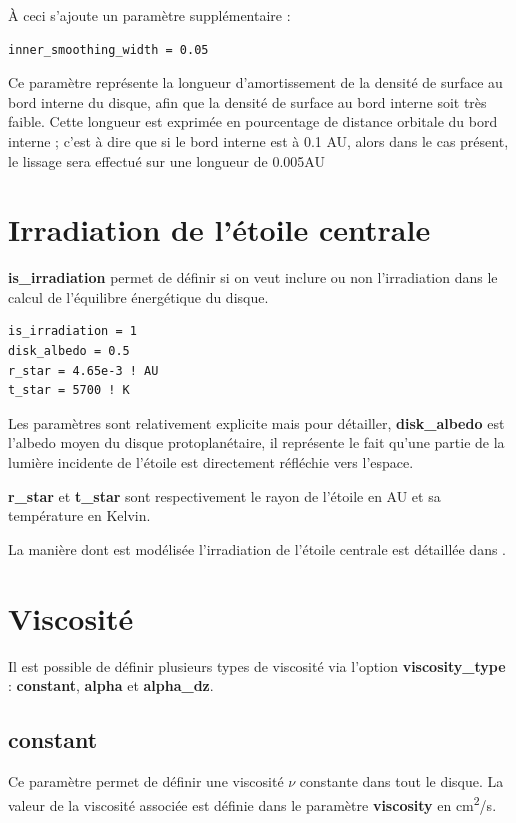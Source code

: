 \bigskip

À ceci s'ajoute un paramètre supplémentaire : 
\begin{verbatim}
inner_smoothing_width = 0.05
\end{verbatim}

Ce paramètre représente la longueur d'amortissement de la densité de surface au bord interne du disque, afin que la densité de surface au bord interne soit très faible. Cette longueur est exprimée en pourcentage de distance orbitale du bord interne ; c'est à dire que si le bord interne est à 0.1 AU, alors dans le cas présent, le lissage sera effectué sur une longueur de 0.005AU

\section{Irradiation de l'étoile centrale}
\textbf{is\_irradiation} permet de définir si on veut inclure ou non l'irradiation dans le calcul de l'équilibre énergétique du disque. 

\begin{verbatim}
is_irradiation = 1
disk_albedo = 0.5
r_star = 4.65e-3 ! AU
t_star = 5700 ! K
\end{verbatim}

Les paramètres sont relativement explicite mais pour détailler, \textbf{disk\_albedo} est l'albedo moyen du disque protoplanétaire, il représente le fait qu'une partie de la lumière incidente de l'étoile est directement réfléchie vers l'espace.

\textbf{r\_star} et \textbf{t\_star} sont respectivement le rayon de l'étoile en AU et sa température en Kelvin.

La manière dont est modélisée l'irradiation de l'étoile centrale est détaillée dans .

\section{Viscosité}
Il est possible de définir plusieurs types de viscosité via l'option \textbf{viscosity\_type} : \textbf{constant}, \textbf{alpha} et \textbf{alpha\_dz}.

\subsection{constant}
Ce paramètre permet de définir une viscosité $\nu$ constante dans tout le disque. La valeur de la viscosité associée est définie dans le paramètre \textbf{viscosity} en \unit{cm^2/s}.

